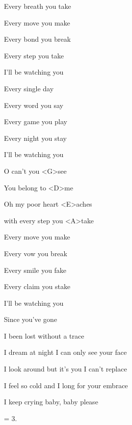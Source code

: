 

\zs
Every breath you take

Every move you make

Every bond you break

Every step you take

I'll be watching you
\ks

\zs
Every single day

Every word you say

Every game you play

Every night you stay

I'll be watching you
\ks

\zr
O can't you <G>see

You belong to <D>me

Oh my poor heart <E>aches 

with every step you <A>take
\kr

\zs
Every move you make

Every vow you break

Every smile you fake

Every claim you stake

I'll be watching you
\ks

\zs
Since you've gone 

I been lost without a trace

I dream at night I can only see your face

I look around but it's you I can't replace

I feel so cold and I long for your embrace

I keep crying baby, baby please
\ks

\zr
\kr

\zs
= 3.
\ks


\kp
